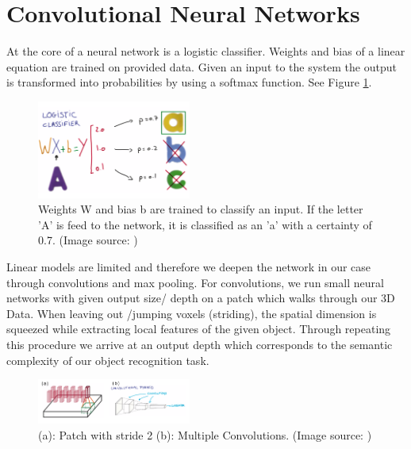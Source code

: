 \documentclass[10pt,twocolumn,letterpaper]{article}
\begin{document}
\section{Convolutional Neural Networks}

At the core of a neural network is a logistic classifier. 
Weights and bias of a linear equation are trained on provided data. Given an input to the system the output is
transformed into probabilities by using a softmax function. See Figure \ref{fig:classifier}.


\begin{figure}[h]
	\label{fig:classifier}
	\centering
	\includegraphics[width=0.45\textwidth]{figures/classifier}
	\caption{Weights W and bias b are trained to classify an input. If the letter 'A' is feed to the network,
	it is classified as an 'a' with a certainty of 0.7. (Image source: \cite{udacity})}
\end{figure}

Linear models are limited and therefore we deepen the network in our case through convolutions and max pooling.
For convolutions, we run small neural networks with given output size/ depth on a patch which walks through our 3D Data. When leaving out /jumping voxels (striding),
the spatial dimension is squeezed while extracting local features of the given object. 
Through repeating this procedure we arrive at an output depth which corresponds to the semantic complexity of our object recognition task. 

\begin{figure}[h]
	\label{fig:convolution}
	\includegraphics[width=0.45\textwidth]{figures/conv}
	\caption{(a): Patch with stride 2 (b): Multiple Convolutions. (Image source: \cite{udacity})}
\end{figure}
\end{document}
